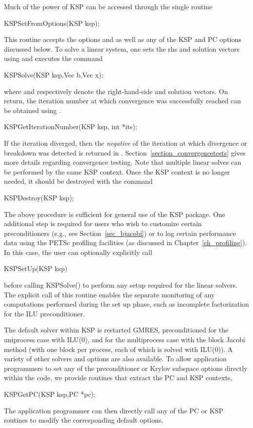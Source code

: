 Much of the power of KSP can be accessed through the single routine
\begin{tabbing}
  KSPSetFromOptions(KSP ksp);
\end{tabbing}
This 
routine accepts the options  and  as well as 
any of the KSP and PC options discussed below. 
To solve a linear system, one sets the rhs and solution vectors using
and executes the
command 
\begin{tabbing}
  KSPSolve(KSP ksp,Vec b,Vec x);
\end{tabbing}
where  and  respectively denote the right-hand-side and
solution vectors.  On return, the iteration number at which convergence
was successfully reached can be obtained using .
\begin{tabbing}
  KSPGetIterationNumber(KSP ksp, int *its);
\end{tabbing}
If the iteration diverged, then the {\em negative} of the iteration at
which divergence or breakdown was detected is returned in .
 Section~\ref{section_convergencetests} gives more details regarding
convergence testing. Note that multiple linear solves can be performed by
the same KSP context. Once the KSP context is no longer needed, it should be
destroyed with the command 
\begin{tabbing}
  KSPDestroy(KSP ksp);
\end{tabbing}

The above procedure is sufficient for general use of the KSP package.
One additional step is required for users who wish to customize certain 
preconditioners (e.g., see Section~\ref{sec_bjacobi}) or to log certain 
performance data using the PETSc profiling facilities (as discussed in 
Chapter~\ref{ch_profiling}).
In this case, the user can optionally explicitly call 
\begin{tabbing}
  KSPSetUp(KSP ksp)
\end{tabbing}
before calling KSPSolve() to perform any setup required for 
the linear solvers.  The explicit call of this routine enables the
separate monitoring of any computations performed during the set up
phase, such as incomplete factorization for the ILU preconditioner.

The default solver within KSP is restarted GMRES, preconditioned for
the uniprocess case with ILU(0), and for the multiprocess case
with the block Jacobi method (with one block per process, each of
which is solved with ILU(0)). A variety of other solvers
and options are also available.
To allow application programmers to set any of the preconditioner or 
Krylov subspace options directly within the code, we provide routines
that extract the PC and KSP contexts, 
\begin{tabbing}
  KSPGetPC(KSP ksp,PC *pc);\\
\end{tabbing}
The application programmer can then directly call any of the PC or KSP 
routines to modify the corresponding default options.   

